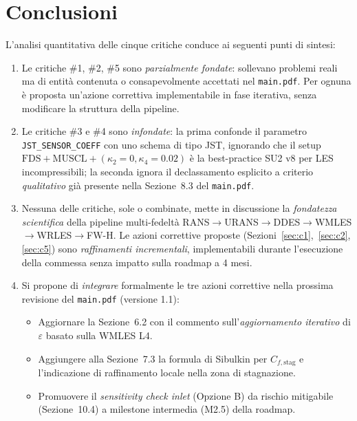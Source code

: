 \documentclass[11pt,a4paper]{article}
\begin{document}
\section{Conclusioni}
\label{sec:concl}

L'analisi quantitativa delle cinque critiche conduce ai seguenti
punti di sintesi:

\begin{enumerate}
  \item Le critiche \#1, \#2, \#5 sono \emph{parzialmente fondate}:
    sollevano problemi reali ma di entità contenuta o
    consapevolmente accettati nel \texttt{main.pdf}. Per ognuna
    è proposta un'azione correttiva implementabile in fase
    iterativa, senza modificare la struttura della pipeline.

  \item Le critiche \#3 e \#4 sono \emph{infondate}: la prima
    confonde il parametro \texttt{JST\_SENSOR\_COEFF} con uno
    schema di tipo JST, ignorando che il setup
    $\mathrm{FDS}+\mathrm{MUSCL}+(\kappa_{2}=0,\kappa_{4}=0.02)$ è
    la best-practice SU2 v8 per LES incompressibili; la seconda
    ignora il declassamento esplicito a criterio \emph{qualitativo}
    già presente nella Sezione~8.3 del \texttt{main.pdf}.

  \item Nessuna delle critiche, sole o combinate, mette in
    discussione la \emph{fondatezza scientifica} della pipeline
    multi-fedeltà RANS$\to$URANS$\to$DDES$\to$WMLES$\to$WRLES$\to$FW-H.
    Le azioni correttive proposte (Sezioni~\ref{sec:c1},~\ref{sec:c2},
    \ref{sec:c5}) sono \emph{raffinamenti incrementali},
    implementabili durante l'esecuzione della commessa senza
    impatto sulla roadmap a 4 mesi.

  \item Si propone di \emph{integrare} formalmente le tre azioni
    correttive nella prossima revisione del \texttt{main.pdf}
    (versione 1.1):
    \begin{itemize}
      \item Aggiornare la Sezione~6.2 con il commento
        sull'\emph{aggiornamento iterativo} di $\varepsilon$ basato
        sulla WMLES L4.
      \item Aggiungere alla Sezione~7.3 la formula di Sibulkin per
        $C_{f,\mathrm{stag}}$ e l'indicazione di raffinamento
        locale nella zona di stagnazione.
      \item Promuovere il \emph{sensitivity check inlet} (Opzione B)
        da rischio mitigabile (Sezione~10.4) a milestone
        intermedia (M2.5) della roadmap.
    \end{itemize}
\end{enumerate}
\end{document}

